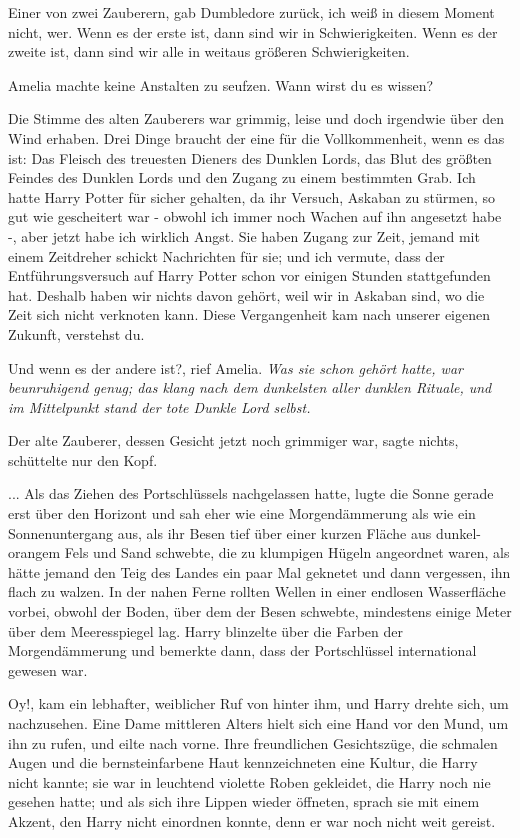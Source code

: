 \glqq{}Einer von zwei Zauberern\grqq{}, gab Dumbledore zurück, \glqq{}ich weiß in
diesem Moment nicht, wer. Wenn es der erste ist, dann sind wir in
Schwierigkeiten. Wenn es der zweite ist, dann sind wir alle in weitaus größeren
Schwierigkeiten.\grqq{}

Amelia machte keine Anstalten zu seufzen. \glqq{}Wann wirst du es wissen?\grqq{}

Die Stimme des alten Zauberers war grimmig, leise und doch irgendwie über den
Wind erhaben. \glqq{}Drei Dinge braucht der eine für die Vollkommenheit, wenn es
das ist: Das Fleisch des treuesten Dieners des Dunklen Lords, das Blut des
größten Feindes des Dunklen Lords und den Zugang zu einem bestimmten Grab. Ich
hatte Harry Potter für sicher gehalten, da ihr Versuch, Askaban zu stürmen, so
gut wie gescheitert war - obwohl ich immer noch Wachen auf ihn angesetzt habe -,
aber jetzt habe ich wirklich Angst. Sie haben Zugang zur Zeit, jemand mit einem
Zeitdreher schickt Nachrichten für sie; und ich vermute, dass der
Entführungsversuch auf Harry Potter schon vor einigen Stunden stattgefunden hat.
Deshalb haben wir nichts davon gehört, weil wir in Askaban sind, wo die Zeit
sich nicht verknoten kann. Diese Vergangenheit kam nach unserer eigenen Zukunft,
verstehst du.\grqq{}

\glqq{}Und wenn es der andere ist?\grqq{}, rief Amelia. \emph{Was sie schon
gehört hatte, war beunruhigend genug; das klang nach dem dunkelsten aller
dunklen Rituale, und im Mittelpunkt stand der tote Dunkle Lord selbst.}

Der alte Zauberer, dessen Gesicht jetzt noch grimmiger war, sagte nichts,
schüttelte nur den Kopf.

... Als das Ziehen des Portschlüssels nachgelassen hatte, lugte die Sonne gerade
erst über den Horizont und sah eher wie eine Morgendämmerung als wie ein
Sonnenuntergang aus, als ihr Besen tief über einer kurzen Fläche aus
dunkel-orangem Fels und Sand schwebte, die zu klumpigen Hügeln angeordnet waren,
als hätte jemand den Teig des Landes ein paar Mal geknetet und dann vergessen,
ihn flach zu walzen. In der nahen Ferne rollten Wellen in einer endlosen
Wasserfläche vorbei, obwohl der Boden, über dem der Besen schwebte, mindestens
einige Meter über dem Meeresspiegel lag. Harry blinzelte über die Farben der
Morgendämmerung und bemerkte dann, dass der Portschlüssel international gewesen
war.

\glqq{}Oy!\grqq{}, kam ein lebhafter, weiblicher Ruf von hinter ihm, und Harry
drehte sich, um nachzusehen. Eine Dame mittleren Alters hielt sich eine Hand vor
den Mund, um ihn zu rufen, und eilte nach vorne. Ihre freundlichen Gesichtszüge,
die schmalen Augen und die bernsteinfarbene Haut kennzeichneten eine Kultur, die
Harry nicht kannte; sie war in leuchtend violette Roben gekleidet, die Harry
noch nie gesehen hatte; und als sich ihre Lippen wieder öffneten, sprach sie mit
einem Akzent, den Harry nicht einordnen konnte, denn er war noch nicht weit
gereist.

